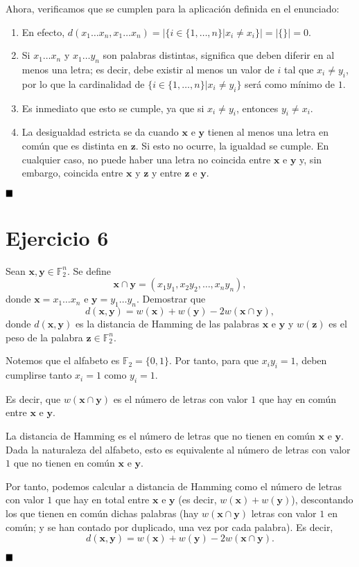 Ahora, verificamos que se cumplen para la aplicación definida en el enunciado:

\begin{enumerate}[label=\alph*)]
	\item En efecto, $d(x_1\hdots x_n, x_1\hdots x_n) = |\{i\in\{1,\hdots,n\}|x_i\neq x_i\}| = |\{\}| = 0$.
	\item Si $x_1\hdots x_n$ y $x_1\hdots y_n$ son palabras distintas, significa que deben diferir en al menos una letra; es decir, debe existir al menos un valor de $i$ tal que $x_i\neq y_i$, por lo que la cardinalidad de $\{i\in\{1,\hdots,n\}|x_i\neq y_i\}$ será como mínimo de $1$.
	\item Es inmediato que esto se cumple, ya que si $x_i\neq y_i$, entonces $y_i \neq x_i$.
	\item La desigualdad estricta se da cuando $\textbf{x}$ e $\textbf{y}$ tienen al menos una letra en común que es distinta en $\textbf{z}$. Si esto no ocurre, la igualdad se cumple. En cualquier caso, no puede haber una letra no coincida entre $\textbf{x}$ e $\textbf{y}$ y, sin embargo, coincida entre $\textbf{x}$ y $\textbf{z}$ y entre $\textbf{z}$ e $\textbf{y}$.
\end{enumerate}

$\qed$

\section{Ejercicio 6}

\begin{formulationBox}
	Sean $\textbf{x}, \textbf{y} \in \mathbb{F}_2^n$. Se define
	\[\textbf{x}\cap\textbf{y}=(x_1y_1, x_2y_2, \hdots, x_ny_n),\]
	donde $\textbf{x}=x_1\hdots x_n$ e $\textbf{y} = y_1\hdots y_n$. Demostrar que
	\[d(\textbf{x}, \textbf{y}) = w(\textbf{x}) + w(\textbf{y}) - 2w(\textbf{x}\cap\textbf{y}),\]
	donde $d(\textbf{x},\textbf{y})$ es la distancia de Hamming de las palabras $\textbf{x}$ e $\textbf{y}$ y $w(\textbf{z})$ es el peso de la palabra $\textbf{z}\in\mathbb{F}_2^n$.
\end{formulationBox}

Notemos que el alfabeto es $\mathbb{F}_2 = \{0, 1\}$. Por tanto, para que $x_iy_i = 1$, deben cumplirse tanto $x_i = 1$ como $y_i = 1$.

Es decir, que $w(\textbf{x}\cap\textbf{y})$ es el número de letras con valor $1$ que hay en común entre $\textbf{x}$ e $\textbf{y}$.

La distancia de Hamming es el número de letras que no tienen en común $\textbf{x}$ e $\textbf{y}$. Dada la naturaleza del alfabeto, esto es equivalente al número de letras con valor $1$ que no tienen en común $\textbf{x}$ e $\textbf{y}$.

Por tanto, podemos calcular a distancia de Hamming como el número de letras con valor $1$ que hay en total entre $\textbf{x}$ e $\textbf{y}$ (es decir, $w(\textbf{x}) + w(\textbf{y})$), descontando los que tienen en común dichas palabras (hay $w(\textbf{x}\cap\textbf{y})$ letras con valor $1$ en común; y se han contado por duplicado, una vez por cada palabra). Es decir, \[d(\textbf{x}, \textbf{y}) = w(\textbf{x}) + w(\textbf{y}) - 2w(\textbf{x}\cap\textbf{y}).\]

$\qed$
